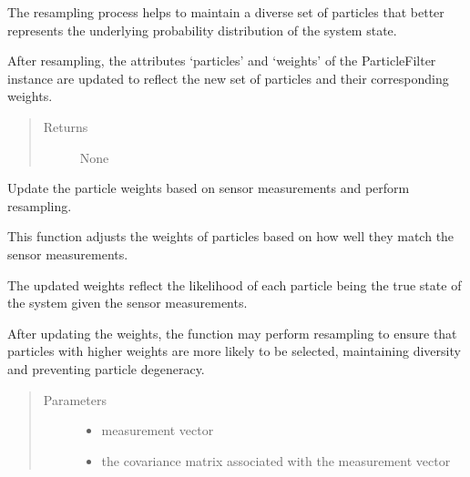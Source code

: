 \documentclass[letterpaper,10pt,english]{sphinxmanual}
\begin{document}
\begin{fulllineitems}
\begin{fulllineitems}
\sphinxAtStartPar
The resampling process helps to maintain a diverse set of particles that better represents the underlying
probability distribution of the system state.

\sphinxAtStartPar
After resampling, the attributes ‘particles’ and ‘weights’ of the ParticleFilter instance are updated
to reflect the new set of particles and their corresponding weights.
\begin{quote}\begin{description}
\item[{Returns}] \leavevmode
\sphinxAtStartPar
None

\end{description}\end{quote}

\end{fulllineitems}


\begin{fulllineitems}
\label{\detokenize{particle_filter:PFMBLocalization.PFMBL.Update}}
\sphinxAtStartPar
Update the particle weights based on sensor measurements and perform resampling.

\sphinxAtStartPar
This function adjusts the weights of particles based on how well they match the sensor measurements.

\sphinxAtStartPar
The updated weights reflect the likelihood of each particle being the true state of the system given
the sensor measurements.

\sphinxAtStartPar
After updating the weights, the function may perform resampling to ensure that particles with higher
weights are more likely to be selected, maintaining diversity and preventing particle degeneracy.
\begin{quote}\begin{description}
\item[{Parameters}] \leavevmode\begin{itemize}
\item {} 
\sphinxAtStartPar
{} \textendash{} measurement vector

\item {} 
\sphinxAtStartPar
{} \textendash{} the covariance matrix associated with the measurement vector


\end{itemize}
\end{description}
\end{quote}
\end{fulllineitems}
\end{fulllineitems}
\end{document}
